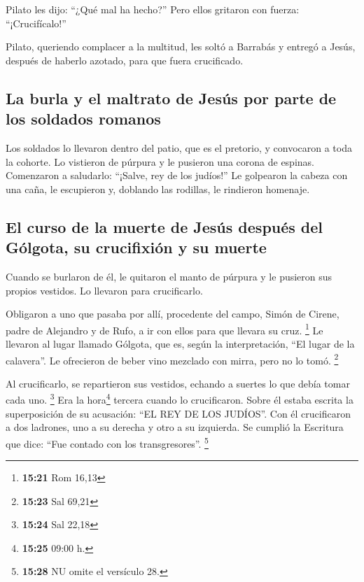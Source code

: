 \begin{paracol}{2}
 Pilato les dijo: ``¿Qué mal ha hecho?'' Pero ellos
gritaron con fuerza: ``¡Crucifícalo!''

 Pilato, queriendo complacer a la multitud, les soltó a
Barrabás y entregó a Jesús, después de haberlo azotado, para que fuera
crucificado.

\hypertarget{la-burla-y-el-maltrato-de-jesuxfas-por-parte-de-los-soldados-romanos}{%
\subsection{La burla y el maltrato de Jesús por parte de los soldados
romanos}\label{la-burla-y-el-maltrato-de-jesuxfas-por-parte-de-los-soldados-romanos}}

 Los soldados lo llevaron dentro del patio, que es el
pretorio, y convocaron a toda la cohorte.  Lo vistieron
de púrpura y le pusieron una corona de espinas. 
Comenzaron a saludarlo: ``¡Salve, rey de los judíos!'' 
Le golpearon la cabeza con una caña, le escupieron y, doblando las
rodillas, le rindieron homenaje.

\hypertarget{el-curso-de-la-muerte-de-jesuxfas-despuuxe9s-del-guxf3lgota-su-crucifixiuxf3n-y-su-muerte}{%
\subsection{El curso de la muerte de Jesús después del Gólgota, su
crucifixión y su
muerte}\label{el-curso-de-la-muerte-de-jesuxfas-despuuxe9s-del-guxf3lgota-su-crucifixiuxf3n-y-su-muerte}}

 Cuando se burlaron de él, le quitaron el manto de
púrpura y le pusieron sus propios vestidos. Lo llevaron para
crucificarlo.

 Obligaron a uno que pasaba por allí, procedente del
campo, Simón de Cirene, padre de Alejandro y de Rufo, a ir con ellos
para que llevara su cruz. \footnote{\textbf{15:21} Rom 16,13}
 Le llevaron al lugar llamado Gólgota, que es, según la
interpretación, ``El lugar de la calavera''.  Le
ofrecieron de beber vino mezclado con mirra, pero no lo tomó.
\footnote{\textbf{15:23} Sal 69,21}

 Al crucificarlo, se repartieron sus vestidos, echando a
suertes lo que debía tomar cada uno. \footnote{\textbf{15:24} Sal 22,18}
 Era la hora\footnote{\textbf{15:25} 09:00 h.} tercera
cuando lo crucificaron.  Sobre él estaba escrita la
superposición de su acusación: ``EL REY DE LOS JUDÍOS''. 
Con él crucificaron a dos ladrones, uno a su derecha y otro a su
izquierda.  Se cumplió la Escritura que dice: ``Fue
contado con los transgresores''. \footnote{\textbf{15:28} NU omite el
  versículo 28.}


\end{paracol}
